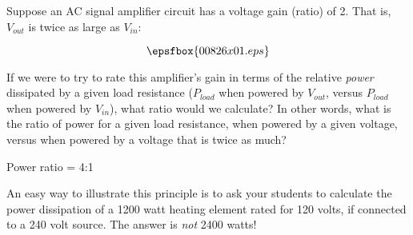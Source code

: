 

Suppose an AC signal amplifier circuit has a voltage gain (ratio) of 2.  That is, $V_{out}$ is twice as large as $V_{in}$:

$$\epsfbox{00826x01.eps}$$

If we were to try to rate this amplifier's gain in terms of the relative {\it power} dissipated by a given load resistance ($P_{load}$ when powered by $V_{out}$, versus $P_{load}$ when powered by $V_{in}$), what ratio would we calculate?  In other words, what is the ratio of power for a given load resistance, when powered by a given voltage, versus when powered by a voltage that is twice as much?







Power ratio = 4:1







An easy way to illustrate this principle is to ask your students to calculate the power dissipation of a 1200 watt heating element rated for 120 volts, if connected to a 240 volt source.  The answer is {\it not} 2400 watts!





